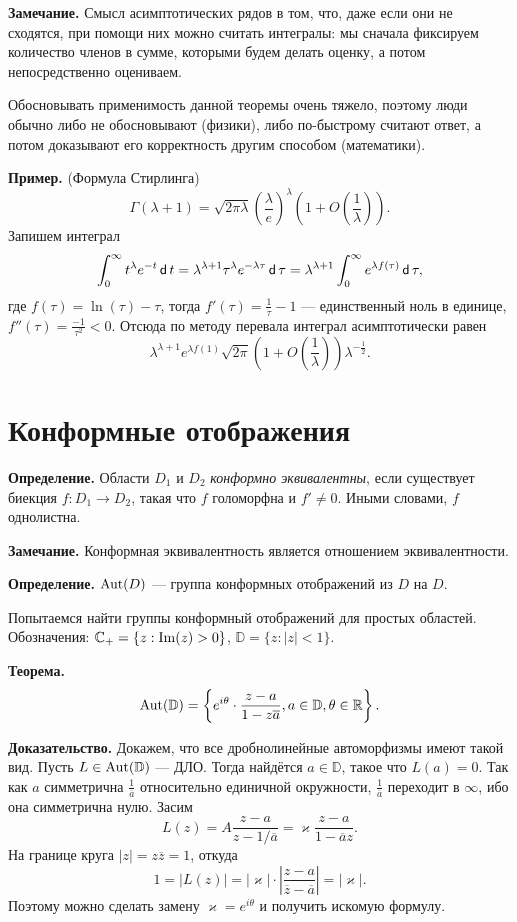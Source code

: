 \QED

\textbf{Замечание.} Смысл асимптотических рядов в том, что, даже если они не сходятся, при помощи них можно считать интегралы: мы сначала фиксируем количество членов в сумме, которыми будем делать оценку, а потом непосредственно оцениваем.

Обосновывать применимость данной теоремы очень тяжело, поэтому люди обычно либо не обосновывают (физики), либо по-быстрому считают ответ, а потом доказывают его корректность другим способом (математики).

\textbf{Пример.} (Формула Стирлинга) 
\[
    \Gamma(\lambda + 1) = \sqrt{2\pi \lambda} \left( \frac{\lambda}{e} \right)^\lambda \left(1 + O \left( \frac{1}{\lambda} \right) \right).
\]
Запишем интеграл
\[
    \int_0^\infty t^\lambda e^{-t} \operatorname{\mathsf d} t = \lambda^{\lambda + 1} \tau^{\lambda} e^{-\lambda \tau} \operatorname{\mathsf d} \tau = \lambda^{\lambda + 1} \int_0^{\infty} e^{\lambda f(\tau)} \operatorname{\mathsf d} \tau,
\]
где $f(\tau) = \ln(\tau) - \tau$, тогда $f'(\tau) = \frac{1}{\tau} - 1$ --- единственный ноль в единице, $f''(\tau) = \frac{-1}{\tau^2} < 0$.
Отсюда по методу перевала интеграл асимптотически равен
\[
    \lambda^{\lambda + 1} e^{\lambda f(1)} \sqrt{2\pi} \left(1 + O \left(\frac{1}{\lambda} \right) \right) \lambda^{-\frac{1}{2}}.
\]

\section{Конформные отображения}
\textbf{Определение.} Области $D_1$ и $D_2$ \textit{конформно эквивалентны}, если существует биекция $f: D_1 \to D_2$, такая что $f$ голоморфна и $f' \ne 0$.
Иными словами, $f$ однолистна.

\textbf{Замечание.} Конформная эквивалентность является отношением эквивалентности.

\textbf{Определение.} $\operatorname{Aut}(D)$ --- группа конформных отображений из $D$ на $D$.

Попытаемся найти группы конформный отображений для простых областей.
Обозначения: $\mathbb C_+ = \{z: \operatorname{Im}(z) > 0\}$, $\mathbb D = \{z: |z| < 1\}$.

\textbf{Теорема.} 
\[
    \operatorname{Aut}(\mathbb D) = \left\{e^{i\theta} \cdot \frac{z - a}{1 - z \overline a}, a \in \mathbb D, \theta \in \mathbb R \right\}.
\]

\textbf{Доказательство.} Докажем, что все дробнолинейные автоморфизмы имеют такой вид.
Пусть $L \in \operatorname{Aut}(\mathbb D)$ --- ДЛО.
Тогда найдётся $a \in \mathbb D$, такое что $L(a) = 0$.
Так как $a$ симметрична $\frac{1}{\overline a}$ относительно единичной окружности, $\frac{1}{\overline a}$ переходит в $\infty$, ибо она симметрична нулю.
Засим
\[
    L(z) = A \frac{z - a}{z - 1/\overline a} = \varkappa \frac{z - a}{1 - \overline a z}.
\]
На границе круга $|z| = z \overline z = 1$, откуда
\[
    1 = |L(z)| = |\varkappa| \cdot \left| \frac{z - a}{\overline z - \overline a} \right| = |\varkappa|.
\]
Поэтому можно сделать замену $\varkappa = e^{i\theta}$ и получить искомую формулу.

